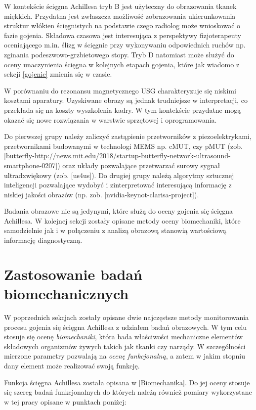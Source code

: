 W kontekście ścięgna Achillesa tryb B jest użyteczny do obrazowania tkanek miękkich. Przydatna jest zwłaszcza możliwość zobrazowania ukierunkowania struktur włókien ścięgnistych na podstawie czego radiolog może wnioskować o fazie gojenia. Składowa czasowa jest interesująca z perspektywy fizjoterapeuty oceniającego m.in. ślizg w ścięgnie przy wykonywaniu odpowiednich ruchów np. zginania podeszwowo-grzbietowego stopy. Tryb D natomiast może służyć do oceny unaczynienia ścięgna w kolejnych etapach gojenia, które jak wiadomo z sekcji \ref{gojenie} zmienia się w czasie.

W porównaniu do rezonansu magnetycznego USG charakteryzuje się niskimi kosztami aparatury. Uzyskiwane obrazy są jednak trudniejsze w interpretacji, co przekłada się na koszty wyszkolenia kadry. W tym kontekście przydatne mogą okazać się nowe rozwiązania w warstwie sprzętowej i oprogramowania. 

Do pierwszej grupy należy zaliczyć zastąpienie przetworników z piezoelektrykami, przetwornikami budowanymi w technologi MEMS np. cMUT, czy pMUT (zob. [butterfly-http://news.mit.edu/2018/startup-butterfly-network-ultrasound-smartphone-0207]) oraz układy pozwalające przetwarzać surowy sygnał ultradxwiękowy (zob. [us4us]). Do drugiej grupy należą algorytmy sztucznej inteligencji pozwalające wydobyć i zinterpretować interesującą informację z niskiej jakości obrazów (np. zob. [nvidia-keynot-clarisa-project]). 

Badania obrazowe nie są jedynymi, które służą do oceny gojenia się ścięgna Achillesa. W kolejnej sekcji zostały opisane metody oceny biomechaniki, które samodzielnie jak i w połączeniu z analizą obrazową stanowią wartościową informację diagnostyczną.

\section{Zastosowanie badań biomechanicznych}

W poprzednich sekcjach zostały opisane dwie najczęstsze metody monitorowania procesu gojenia się ścięgna Achillesa z udziałem badań obrazowych. W tym celu stosuje się ocenę \textit{biomechaniki}, która bada właściwości mechaniczne elementów składowych organizmów żywych takich jak tkanki czy narządy. W szczególności mierzone parametry pozwalają na \textit{ocenę funkcjonalną}, a zatem w jakim stopniu dany element może realizować swoją funkcję.

Funkcja ścięgna Achillesa została opisana w \ref{Biomechanika}. Do jej oceny stosuje się szereg badań funkcjonalnych do których należą również pomiary wykorzystane w tej pracy opisane w punktach poniżej:

